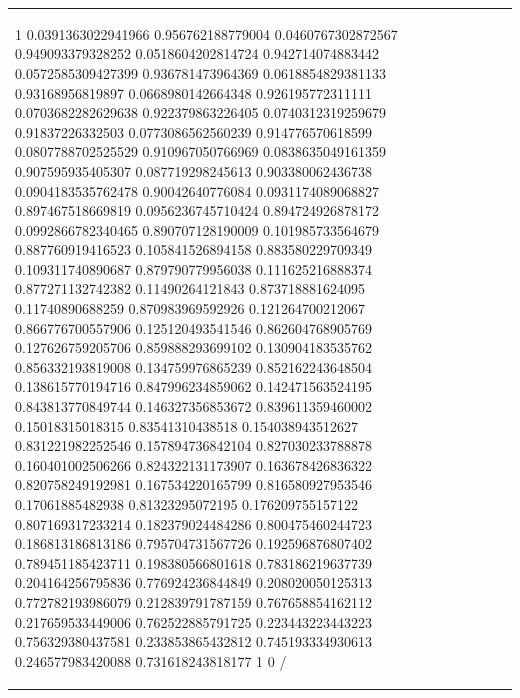 \documentclass[runningheads]{llncs}\usepackage[]{graphicx}\usepackage[]{color}
\renewcommand{\sparklineheight}{2}
\begin{document}
\begin{table}[ht]
\begin{tabular}{l|p{2.2cm}p{2.2cm}p{2.2cm}p{2.2cm}}
{\begin{sparkline}{10}
\spark 0 1 0.0391363022941966 0.956762188779004 0.0460767302872567 0.949093379328252 0.0518604202814724 0.942714074883442 0.0572585309427399 0.936781473964369 0.0618854829381133 0.93168956819897 0.0668980142664348 0.926195772311111 0.0703682282629638 0.922379863226405 0.0740312319259679 0.91837226332503 0.0773086562560239 0.914776570618599 0.0807788702525529 0.910967050766969 0.0838635049161359 0.907595935405307 0.087719298245613 0.903380062436738 0.0904183535762478 0.90042640776084 0.0931174089068827 0.897467518669819 0.0956236745710424 0.894724926878172 0.0992866782340465 0.890707128190009 0.101985733564679 0.887760919416523 0.105841526894158 0.883580229709349 0.109311740890687 0.879790779956038 0.111625216888374 0.877271132742382 0.11490264121843 0.873718881624095 0.11740890688259 0.870983969592926 0.121264700212067 0.866776700557906 0.125120493541546 0.862604768905769 0.127626759205706 0.859888293699102 0.130904183535762 0.856332193819008 0.134759976865239 0.852162243648504 0.138615770194716 0.847996234859062 0.142471563524195 0.843813770849744 0.146327356853672 0.839611359460002 0.15018315018315 0.83541310438518 0.154038943512627 0.831221982252546 0.157894736842104 0.827030233788878 0.160401002506266 0.824322131173907 0.163678426836322 0.820758249192981 0.167534220165799 0.816580927953546 0.17061885482938 0.81323295072195 0.176209755157122 0.807169317233214 0.182379024484286 0.800475460244723 0.186813186813186 0.795704731567726 0.192596876807402 0.789451185423711 0.198380566801618 0.783186219637739 0.204164256795836 0.776924236844849 0.208020050125313 0.772782193986079 0.212839791787159 0.767658854162112 0.217659533449006 0.762522885791725 0.223443223443223 0.756329380437581 0.233853865432812 0.745193334930613 0.246577983420088 0.731618243818177 1 0 /
\end{sparkline}} & {\renewcommand{\sparklineheight}{3}\definecolor{sparklinecolor}{named}{black}\begin{sparkline}{10}

\end{sparkline}}
\end{tabular}
\end{table}
\end{document}
